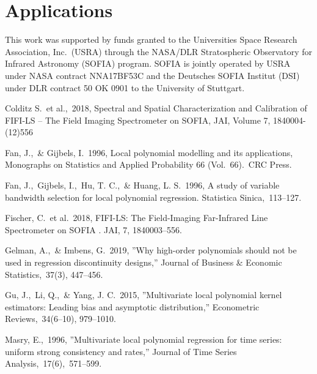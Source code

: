 \documentclass[preprint]{aastex63}
\begin{document}
\section{Applications}\label{sec:applications}




\acknowledgments
This work was supported by funds granted to the Universities Space Research
Association, Inc.\ (USRA) through the NASA/DLR Stratospheric Observatory for
Infrared Astronomy (SOFIA) program.
SOFIA is jointly operated by USRA under NASA contract NNA17BF53C and the
Deutsches SOFIA Institut (DSI) under DLR contract 50 OK 0901 to the University
of Stuttgart.

\begin{thebibliography}{}

Colditz S.\ et al.,\ 2018,
Spectral and Spatial Characterization and Calibration of FIFI-LS -- The Field
Imaging Spectrometer on SOFIA,
JAI, Volume 7, 1840004-(12)556

Fan, J.,\ \& Gijbels, I.\ 1996,
Local polynomial modelling and its applications,
Monographs on Statistics and Applied Probability 66 (Vol.\ 66).\ CRC Press.

Fan, J.,\ Gijbels, I.,\ Hu, T. C.,\ \& Huang, L. S.\ 1996,
A study of variable bandwidth selection for local polynomial regression.
Statistica Sinica,\ 113--127.

Fischer, C.\ et al.\ 2018,
FIFI-LS: The Field-Imaging Far-Infrared Line Spectrometer on SOFIA .
JAI, 7, 1840003--556.

Gelman, A.,\ \& Imbens, G.\ 2019,
''Why high-order polynomials should not be used in regression discontinuity
designs,''
Journal of Business \& Economic Statistics,\ 37(3), 447--456.

Gu, J.,\ Li, Q.,\ \& Yang, J. C.\ 2015,
''Multivariate local polynomial kernel estimators: Leading bias and asymptotic
distribution,''
Econometric Reviews,\ 34(6--10), 979--1010.

Masry, E.,\ 1996,
''Multivariate local polynomial regression for time series: uniform strong
consistency and rates,''
Journal of Time Series Analysis,\ 17(6),\ 571--599.


\end{thebibliography}
\end{document}
